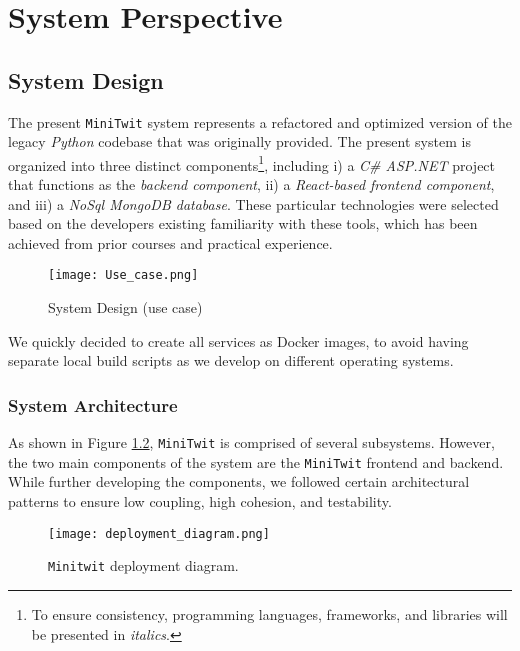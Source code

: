 \chapter{System Perspective}

\section{System Design}

The present \texttt{MiniTwit} system represents a refactored and optimized version of the legacy \textit{Python} codebase that was originally provided. The present system is organized into three distinct components\footnote{To ensure consistency, programming languages, frameworks, and libraries will be presented in \textit{italics}.}, including i) a \textit{C\# ASP.NET} project that functions as the \textit{backend component}, ii) a \textit{React-based frontend component}, and iii) a \textit{NoSql MongoDB database}. These particular technologies were selected based on the developers existing familiarity with these tools, which has been achieved from prior courses and practical experience. 

\vspace{-0.2cm}
\begin{figure}[H]
    \centering
    \texttt{[image: Use\_case.png]}
    \vspace{-0.6cm}
    \caption{System Design (use case)}
    \label{fig:use_case_diagram}
\end{figure}
\vspace{-0.4cm}

We quickly decided to create all services as Docker images, to avoid having separate local build scripts as we develop on different operating systems.

\subsection{System Architecture}

As shown in Figure \ref{fig:deployment_diagram}, \texttt{MiniTwit} is comprised of several subsystems. However, the two main components of the system are the \texttt{MiniTwit} frontend and backend. While further developing the components, we followed certain architectural patterns to ensure low coupling, high cohesion, and testability.

\begin{figure}[H]
    \centering
    \texttt{[image: deployment\_diagram.png]}
    \vspace{-0.8cm}
    \caption{\texttt{Minitwit} deployment diagram.}
    \label{fig:deployment_diagram}
\end{figure}
\vspace{-0.3cm}

